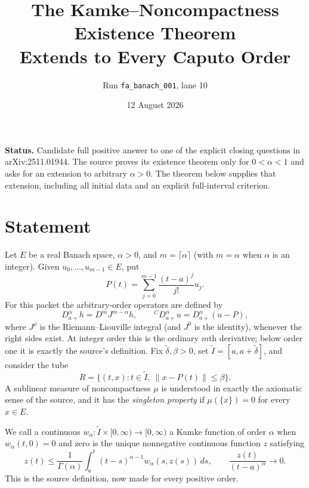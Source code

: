 \documentclass[11pt]{article}
\title{The Kamke--Noncompactness Existence Theorem\\
Extends to Every Caputo Order}
\author{Run \texttt{fa\_banach\_001}, lane 10}
\date{12 August 2026}
\newcommand{\Ga}{\Gamma}
\begin{document}
\maketitle

\textbf{Status.} Candidate full positive answer to one of the explicit closing
questions in arXiv:2511.01944.  The source proves its existence theorem only
for $0<\alpha<1$ and asks for an extension to arbitrary $\alpha>0$.  The
theorem below supplies that extension, including all initial data and an
explicit full-interval criterion.

\section{Statement}

Let $E$ be a real Banach space, $\alpha>0$, and $m=\lceil\alpha\rceil$ (with
$m=\alpha$ when $\alpha$ is an integer).  Given $u_0,\ldots,u_{m-1}\in E$, put
\[
 P(t)=\sum_{j=0}^{m-1}\frac{(t-a)^j}{j!}u_j.                 \tag{1}
\]
For this packet the arbitrary-order operators are defined by
\[
 D_{a+}^{\alpha}h=D^mJ^{m-\alpha}h,
 \qquad {}^CD_{a+}^{\alpha}u=D_{a+}^{\alpha}(u-P),           \tag{1a}
\]
where $J^\rho$ is the Riemann--Liouville integral (and $J^0$ is the identity),
whenever the right sides exist.  At integer order this is the ordinary
$m$th derivative; below order one it is exactly the source's definition.
Fix $\widetilde\delta,\beta>0$, set $\widetilde I=[a,a+\widetilde\delta]$, and
consider the tube
\[
 R=\{(t,x):t\in\widetilde I,\ \|x-P(t)\|\leq\beta\}.
\]
A sublinear measure of noncompactness $\mu$ is understood in exactly the
axiomatic sense of the source, and it has the \emph{singleton property} if
$\mu(\{x\})=0$ for every $x\in E$.

We call a continuous
$w_\alpha:\widetilde I\times[0,\infty)\to[0,\infty)$ a Kamke function of
order $\alpha$ when $w_\alpha(t,0)=0$ and zero is the unique nonnegative
continuous function $z$ satisfying
\[
 z(t)\leq \frac1{\Ga(\alpha)}\int_a^t(t-s)^{\alpha-1}
 w_\alpha(s,z(s))\,ds,\qquad
 \frac{z(t)}{(t-a)^\alpha}\longrightarrow0.                \tag{2}
\]
This is the source definition, now made for every positive order.
\end{document}
